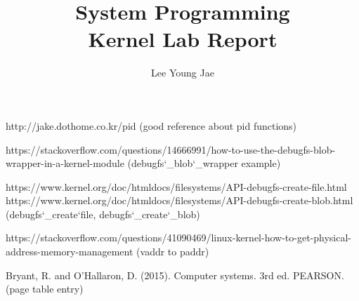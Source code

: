 \documentclass[a4paper,12pt,twoside]{report}
\begin{document}
\title{System Programming\\Kernel Lab Report\\}

\author{Lee Young Jae}

\normallinespacing %
\maketitle


\body
\linespread{1}




\appendix


% 
% 

\begin{thebibliography}{9}
http://jake.dothome.co.kr/pid
(good reference about pid functions)

https://stackoverflow.com/questions/14666991/how-to-use-the-debugfs-blob-wrapper-in-a-kernel-module
(debugfs\char`_blob\char`_wrapper example)

https://www.kernel.org/doc/htmldocs/filesystems/API-debugfs-create-file.html\\
https://www.kernel.org/doc/htmldocs/filesystems/API-debugfs-create-blob.html\\
(debugfs\char`_create\char`file, debugfs\char`_create\char`_blob)

https://stackoverflow.com/questions/41090469/linux-kernel-how-to-get-physical-address-memory-management
(vaddr to paddr)

Bryant, R. and O'Hallaron, D. (2015). Computer systems. 3rd ed. PEARSON.
(page table entry)

\end{thebibliography}
\end{document}
